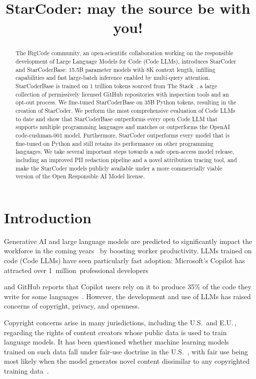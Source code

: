\title{StarCoder: may the source be with you!}

\begin{abstract}
The BigCode community, an open-scientific collaboration working on the responsible development of Large Language Models for Code (Code LLMs), introduces StarCoder and StarCoderBase: 15.5B parameter models with 8K context length, infilling capabilities and fast large-batch inference enabled by multi-query attention. StarCoderBase is trained on 1 trillion tokens sourced from The Stack~\citep{Kocetkov2022TheStack}, a large collection of permissively licensed GitHub repositories with inspection tools and an opt-out process. We fine-tuned StarCoderBase on 35B Python tokens, resulting in the creation of StarCoder. We perform the most comprehensive evaluation of Code LLMs to date and show that StarCoderBase outperforms every open Code LLM that supports multiple programming languages and matches or outperforms the OpenAI code-cushman-001 model. Furthermore, StarCoder outperforms every model that is fine-tuned on Python and still retains its performance on other programming languages. We take several important steps towards a safe open-access model release, including an improved PII redaction pipeline and a novel attribution tracing tool, and make the StarCoder models publicly available under a more commercially viable version of the Open Responsible AI Model license.
\end{abstract}

\section{Introduction}

Generative AI and large language models \citep[LLMs;][]{brown2020language, chen2021codex,chowdhery2022palm,zhang2022opt,openai2023gpt4} are predicted to significantly impact the workforce in the coming years~\citep{eloundou2023gpts, stanford2022foundation,wef2023futureofjobs} by boosting worker productivity. LLMs trained on code (Code LLMs) have seen particularly fast adoption: Microsoft’s Copilot has attracted over 1~million~professional developers~\citep{euronews2023copilot}

and GitHub reports that Copilot users rely on it to produce 35\% of the code they write for some languages~\citep{thompson-2022-copilot-stats}. However, the development and use of LLMs has raised concerns of copyright, privacy, and openness.

Copyright concerns arise in many jurisdictions, including the U.S.\ and E.U.\,, regarding the rights of content creators whose public data is used to train language models. It has been questioned whether machine learning models trained on such data fall under fair-use doctrine in the U.S.~\citep{kuhn2022copilot,butterick2022copilot,rothchild2022copyright}, with fair use being most likely when the model generates novel content dissimilar to any copyrighted training data~\citep{lemley2020fair,levendowski2018copyright}. 


